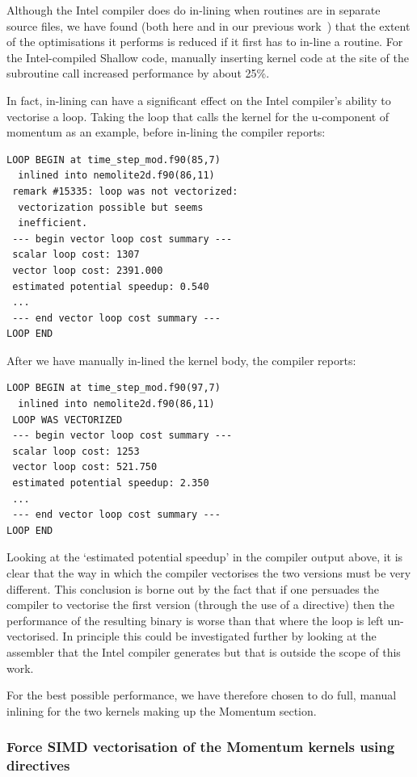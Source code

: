 \documentclass[gmdd, manuscript]{copernicus}
\begin{document}
Although the Intel compiler does do in-lining when routines are in
separate source files, we have found (both here and in our previous
work~\citep{shallow_psykal}) that the extent of the optimisations it
performs is reduced if it first has to in-line a routine. For the
Intel-compiled Shallow code, manually inserting kernel code at the
site of the subroutine call increased performance by about 25\%.

In fact, in-lining can have a significant effect on the Intel
compiler's ability to vectorise a loop. Taking the loop that calls the
kernel for the u-component of momentum as an example, before in-lining
the compiler reports:
\begin{verbatim}
LOOP BEGIN at time_step_mod.f90(85,7) 
  inlined into nemolite2d.f90(86,11)
 remark #15335: loop was not vectorized: 
  vectorization possible but seems 
  inefficient. 
 --- begin vector loop cost summary ---
 scalar loop cost: 1307 
 vector loop cost: 2391.000 
 estimated potential speedup: 0.540 
 ...
 --- end vector loop cost summary ---
LOOP END
\end{verbatim}
After we have manually in-lined the kernel body, the compiler reports:
\begin{verbatim}
LOOP BEGIN at time_step_mod.f90(97,7) 
  inlined into nemolite2d.f90(86,11)
 LOOP WAS VECTORIZED
 --- begin vector loop cost summary ---
 scalar loop cost: 1253 
 vector loop cost: 521.750 
 estimated potential speedup: 2.350 
 ...
 --- end vector loop cost summary ---
LOOP END
\end{verbatim}
Looking at the `estimated potential speedup' in the compiler output
above, it is clear that the way in which the compiler vectorises the
two versions must be very different. This conclusion is borne out by
the fact that if one persuades the compiler to vectorise the first
version (through the use of a directive) then the performance of the
resulting binary is worse than that where the loop is left
un-vectorised. In principle this could be investigated further by
looking at the assembler that the Intel compiler generates but that is
outside the scope of this work.

For the best possible performance, we have therefore chosen to do full, manual
inlining for the two kernels making up the Momentum section.

\subsubsection{Force SIMD vectorisation of the Momentum kernels 
 using directives}
\end{document}
